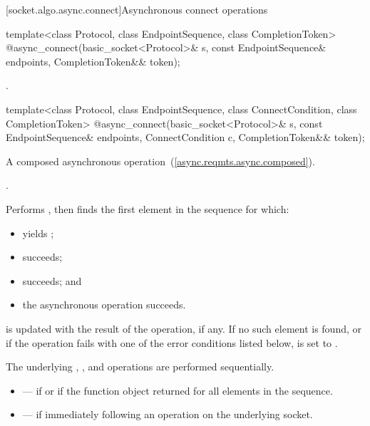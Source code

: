 [socket.algo.async.connect]{Asynchronous connect operations}

\begin{itemdecl}
template<class Protocol, class EndpointSequence, class CompletionToken>
  @\DEDUCED@ async_connect(basic_socket<Protocol>& s,
                        const EndpointSequence& endpoints,
                        CompletionToken&& token);
\end{itemdecl}

\begin{itemdescr}
\pnum
\returns {}.
\end{itemdescr}

\begin{itemdecl}
template<class Protocol, class EndpointSequence,
  class ConnectCondition, class CompletionToken>
    @\DEDUCED@ async_connect(basic_socket<Protocol>& s,
                          const EndpointSequence& endpoints,
                          ConnectCondition c,
                          CompletionToken&& token);
\end{itemdecl}

\begin{itemdescr}
\pnum
A composed asynchronous operation~(\ref{async.reqmts.async.composed}).

\pnum
\completionsig {}.

\pnum
\effects Performs , then finds the first element  in the sequence  for which:
\begin{itemize}
\item
{} yields ;
\item
{} succeeds;
\item
{} succeeds; and
\item
 the asynchronous operation  succeeds.
\end{itemize}
\pnum
{} is updated with the result of the  operation, if any. If no such element is found, or if the operation fails with one of the error conditions listed below,  is set to . \begin{note} The underlying , , and  operations are performed sequentially. \end{note}

\pnum
\errors
\begin{itemize}
\item
{} --- if  or if the function object  returned  for all elements in the sequence.
\item
{} --- if  immediately following an  operation on the underlying socket.
\end{itemize}
\end{itemdescr}

